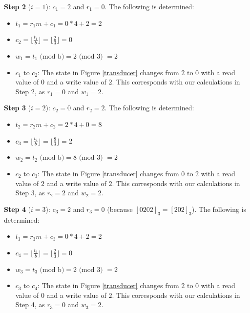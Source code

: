 \documentclass{article}
\begin{document}
\noindent
\textbf{Step 2} ($i = 1$): $c_1 = 2$ and $r_1 = 0$. The following is determined:
\begin{itemize}
  \item $t_1 = r_1m + c_1 = 0*4 + 2 = 2$
  \item $c_2 = \lfloor{\frac{t_1}{b}} \rfloor = \lfloor{\frac{2}{3}} \rfloor = 0$
  \item $w_1 = t_1 \text{ (mod b)} = 2 \text{ (mod 3) } = 2$
  \item $c_1$ to $c_2$: The state in Figure \ref{transducer} changes from $2$ to $0$ with a read value of $0$ and a write value of $2$. This corresponds with our calculations in Step 2, as $r_1 = 0$ and $w_1 = 2$.
\end{itemize} \vspace{\baselineskip}

\noindent
\textbf{Step 3} ($i = 2$): $c_2 = 0$ and $r_2 = 2$. The following is determined: 
\begin{itemize}
  \item $t_2 = r_2m + c_2 = 2*4 + 0 = 8$
  \item $c_3 = \lfloor{\frac{t_2}{b}} \rfloor = \lfloor{\frac{8}{3}} \rfloor = 2$
  \item $w_2 = t_2 \text{ (mod b)} = 8 \text{ (mod 3) } = 2$
  \item $c_2$ to $c_3$: The state in Figure \ref{transducer} changes from $0$ to $2$ with a read value of $2$ and a write value of $2$. This corresponds with our calculations in Step 3, as $r_2 = 2$ and $w_2 = 2$.
\end{itemize} \vspace{\baselineskip}

\noindent
\textbf{Step 4} ($i = 3$): $c_3 = 2$ and $r_3 = 0$ (because $[0202]_3 = [202]_3$). The following is determined:
\begin{itemize}
  \item $t_3 = r_3m + c_3 = 0*4 + 2 = 2$
  \item $c_4 = \lfloor{\frac{t_3}{b}} \rfloor = \lfloor{\frac{2}{3}} \rfloor = 0$
  \item $w_3 = t_3 \text{ (mod b)} = 2 \text{ (mod 3) } = 2$
  \item $c_3$ to $c_4$: The state in Figure \ref{transducer} changes from $2$ to $0$ with a read value of $0$ and a write value of $2$. This corresponds with our calculations in Step 4, as $r_3 = 0$ and $w_3 = 2$.
\end{itemize} \vspace{\baselineskip}
\end{document}
